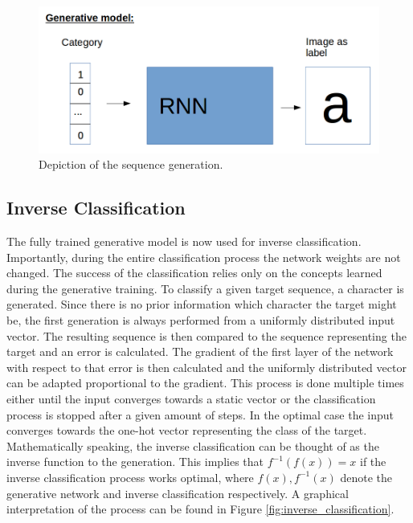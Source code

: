 \documentclass{article}
\begin{document}
\begin{figure}[!htb]
	\centering
	\includegraphics[width=\textwidth]{images/generative_model.png}
	\caption{Depiction of the sequence generation.}
	\label{fig:generative_model}
\end{figure}

\subsection{Inverse Classification}

The fully trained generative model is now used for inverse classification. Importantly, during the entire classification process the network weights are not changed. The success of the classification relies only on the concepts learned during the generative training. To classify a given target sequence, a character is generated. Since there is no prior information which character the target might be, the first generation is always performed from a uniformly distributed input vector. The resulting sequence is then compared to the sequence representing the target and an error is calculated. The gradient of the first layer of the network with respect to that error is then calculated and the uniformly distributed vector can be adapted proportional to the gradient. This process is done multiple times either until the input converges towards a static vector or the classification process is stopped after a given amount of steps. In the optimal case the input converges towards the one-hot vector representing the class of the target. Mathematically speaking, the inverse classification can be thought of as the inverse function to the generation. This implies that $f^{-1}(f(x)) = x$ if the inverse classification process works optimal, where $f(x), f^{-1}(x)$ denote the generative network and inverse classification respectively. A graphical interpretation of the process can be found in Figure \ref{fig:inverse_classification}. 
\end{document}

